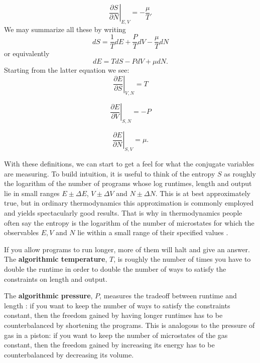 \documentclass{article}
\begin{document}
\begin{equation}
\label{derivative3}
\displaystyle{\left.\frac{\partial S}{\partial N}\right|_{E,V}}  =
-\displaystyle{\frac{\mu}{T}} .
\end{equation}
We may summarize all these by writing
\[            dS = \frac{1}{T} dE + \frac{P}{T} dV - \frac{\mu}{T} dN  \]
or equivalently
\begin{equation}
\label{differentials}
          dE = T dS - P dV + \mu dN  .
\end{equation}
Starting from the latter equation we see:
\begin{equation}
\label{derivatives1}
\displaystyle{\left.\frac{\partial E}{\partial S}\right|_{V,N}}  =
\displaystyle{T} 
\end{equation}

\begin{equation}
\label{derivatives2}
\displaystyle{\left.\frac{\partial E}{\partial V}\right|_{S,N}} =
\displaystyle{-P}
\end{equation}

\begin{equation}
\label{derivatives3}
\displaystyle{\left.\frac{\partial E}{\partial N}\right|_{S,V}}  =
\displaystyle{\mu} .
\end{equation}

With these definitions, we can start to get a feel for what the
conjugate variables are measuring.  To build intuition, it is useful
to think of the entropy $S$ as roughly the logarithm of the number of
programs whose log runtimes, length and output lie in small ranges $E
\pm \Delta E$, $V \pm \Delta V$ and $N \pm \Delta N$. This is at best
approximately true, but in ordinary thermodynamics this approximation
is commonly employed and yields spectacularly good results.  That is
why in thermodynamics people often say the entropy is the logarithm of
the number of microstates for which the observables $E, V$ and $N$ lie
within a small range of their specified values \cite{Reif}.

If you allow programs to run longer, more of them will halt and give
an answer.  The \textbf{algorithmic temperature}, $T$, is
roughly the number of times you have to double the runtime in order 
to double the number of ways to satisfy the constraints on length and output.

The \textbf{algorithmic pressure}, $P$, measures the tradeoff between 
runtime and length \cite{CSHalting2006}: if you want to keep the number of 
ways to satisfy the constraints constant, then the freedom gained by having 
longer runtimes has to be counterbalanced by shortening the programs.
This is analogous to the pressure of gas in a piston: if you want
to keep the number of microstates of the gas constant, then the freedom 
gained by increasing its energy has to be counterbalanced by decreasing
its volume.  
\end{document}
